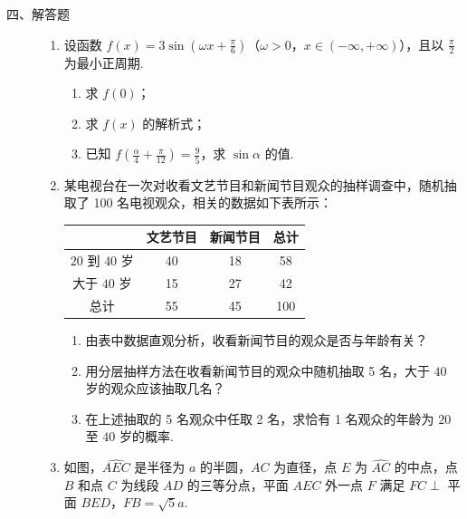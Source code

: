 \begin{description}

    \item[四、解答题]

    \begin{enumerate}[leftmargin=5pt]

      \addtocounter{enumi}{+15}

        \item 设函数 \(f(x) = 3\sin \left(\omega x + \frac{\pi}{6}\right)\)（\(\omega > 0\)，\(x \in (-\infty, +\infty)\)），且以 \(\frac{\pi}{2}\) 为最小正周期.

\begin{enumerate}
\item 求 \(f(0)\)；
\item 求 \(f(x)\) 的解析式；
\item 已知 \(f\left(\frac{\alpha}{4} + \frac{\pi}{12}\right) = \frac{9}{5}\)，求 \(\sin \alpha\) 的值.
\end{enumerate}

        \item 某电视台在一次对收看文艺节目和新闻节目观众的抽样调查中，随机抽取了 100 名电视观众，相关的数据如下表所示：

\begin{center}
\begin{tabular}{c|ccc}
 & 文艺节目 & 新闻节目 & 总计 \\
\hline
\(20\) 到 \(40\) 岁 & 40 & 18 & 58 \\
大于 \(40\) 岁 & 15 & 27 & 42 \\
\hline
总计 & 55 & 45 & 100
\end{tabular}
\end{center}

\begin{enumerate}
\item 由表中数据直观分析，收看新闻节目的观众是否与年龄有关？
\item 用分层抽样方法在收看新闻节目的观众中随机抽取 5 名，大于 \(40\) 岁的观众应该抽取几名？
\item 在上述抽取的 5 名观众中任取 2 名，求恰有 1 名观众的年龄为 \(20\) 至 \(40\) 岁的概率.
\end{enumerate}

        \item 如图，\(\widehat{AEC}\) 是半径为 \(a\) 的半圆，\(AC\) 为直径，点 \(E\) 为 \(\widehat{AC}\) 的中点，点 \(B\) 和点 \(C\) 为线段 \(AD\) 的三等分点，平面 \(AEC\) 外一点 \(F\) 满足 \(FC \perp\) 平面 \(BED\)，\(FB = \sqrt{5}a\).


\end{enumerate}
\end{description}
